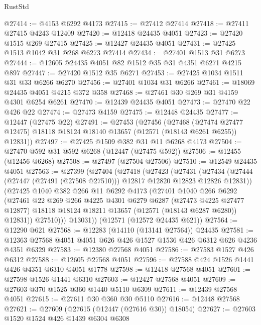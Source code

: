 \begin{lexlean}{RustStd}
\begin{coremodule}
@27414 := @4153 @6292 @4173
@27415 := @27412 @27414
@27418 := @27411 @27415 @4243 @12409
@27420 := @12418 @24435 @4051
@27423 := @27420 @1515 @269 @27415
@27425 := @12427 @24435 @4051
@27431 := @27425 @1513 @1042 @31 @268 @6273 @27414
@27434 := @27401 @1513 @31 @6273
@27444 := @12605 @24435 @4051 @82 @1512 @35 @31 @4351 @6271 @4215 @897
@27447 := @27420 @1512 @35 @6271
@27453 := @27425 @1034 @1511 @31 @33 @6266 @6270
@27456 := @27401 @1034 @31 @6266
@27461 := @18069 @24435 @4051 @4215 @372 @358
@27468 := @27461 @30 @269 @31 @4159 @4301 @6254 @6261
@27470 := @12439 @24435 @4051
@27473 := @27470 @22 @426 @22
@27474 := @27473 @4159
@27475 := @12448 @24435
@27477 := @12447 (@27475 @22)
@27491 := @27453
    (@27456
      (@27468
        (@27474 @27477 @12475)
        @18118
        @18124
        @18140
        @13657
        (@12571 (@18143 @6261 @6255))
        @12831))
@27497 := @27425 @1509 @382 @31 @11 @6268 @4173
@27504 := @27470 @592 @31 @592 @6268 (@12447 (@27475 @592))
@27506 := @12455 (@12456 @6268)
@27508 := @27497 (@27504 @27506)
@27510 := @12549 @24435 @4051
@27563 := @27399
    (@27404
      (@27418
        (@27423
          (@27431
            (@27434 (@27444 (@27447 (@27491 (@27508 @27510))) @12817 @12820 @12823 @12826 @12831))
            (@27425
              @1040
              @382
              @266
              @11
              @6292
              @4173
              (@27401
                @1040
                @266
                @6292
                (@27461
                  @22
                  @269
                  @266
                  @4225
                  @4301
                  @6279
                  @6287
                  (@27473 @4225 @27477 @12877)
                  @18118
                  @18124
                  @18211
                  @13657
                  (@12571 (@18143 @6287 @6280))
                  @12831))
              @27510)))
        @13031))
    (@12571 (@12572 @24435 @621))
@27564 := @12290 @621
@27568 := @12283 (@14110 (@13141 @27564)) @24435
@27581 := @12363 @27568 @4051 @4051 @626 @426 @1527 @1536 @426 @6312 @626 @4236 @4351 @6329
@27583 := @12380 @27568 @4051
@27586 := @27583 @1527 @426 @6312
@27588 := @12605 @27568 @4051
@27596 := @27588 @424 @1526 @1441 @426 @4351 @6310 @4051 @1778
@27598 := @12418 @27568 @4051
@27601 := @27598 @1526 @1441 @6310
@27603 := @12427 @27568 @4051
@27609 := @27603 @370 @1525 @360 @1440 @5110 @6309
@27611 := @12439 @27568 @4051
@27615 := @27611 @30 @360 @30 @5110
@27616 := @12448 @27568
@27621 := @27609 (@27615 (@12447 (@27616 @30)) @18054)
@27627 := @27603 @1520 @1524 @426 @1439 @6304 @6308

\end{coremodule}
\end{lexlean}
